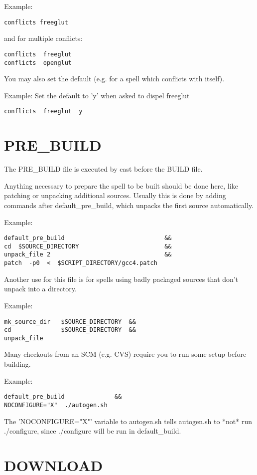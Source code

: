 \documentclass[a4paper,10pt]{book}
\begin{document}
Example:
\begin{verbatim}
conflicts freeglut
\end{verbatim}

and for multiple conflicts:
\begin{verbatim}
conflicts  freeglut
conflicts  openglut
\end{verbatim}

You may also set the default (e.g. for a spell which conflicts with itself).

Example: Set the default to 'y' when asked to dispel freeglut
\begin{verbatim}
conflicts  freeglut  y
\end{verbatim}

\section{PRE\_BUILD}
The PRE\_BUILD file is executed by cast before the BUILD file.

Anything necessary to prepare the spell to be built should be done here, like
patching or unpacking additional sources. Usually this is done by adding
commands after default\_pre\_build, which unpacks the first source
automatically.

Example:
\begin{verbatim}
default_pre_build                            &&
cd  $SOURCE_DIRECTORY                        &&
unpack_file 2                                &&
patch  -p0  <  $SCRIPT_DIRECTORY/gcc4.patch
\end{verbatim}

Another use for this file is for spells using badly packaged sources that don't
unpack into a directory.

Example:
\begin{verbatim}
mk_source_dir   $SOURCE_DIRECTORY  &&
cd              $SOURCE_DIRECTORY  &&
unpack_file
\end{verbatim}

Many checkouts from an SCM (e.g. CVS) require you to run some setup before
building.

Example:
\begin{verbatim}
default_pre_build              &&
NOCONFIGURE="X"  ./autogen.sh
\end{verbatim}

The 'NOCONFIGURE="X"' variable to autogen.sh tells autogen.sh to *not* run
./configure, since ./configure will be run in default\_build.

\section{DOWNLOAD}
\end{document}
